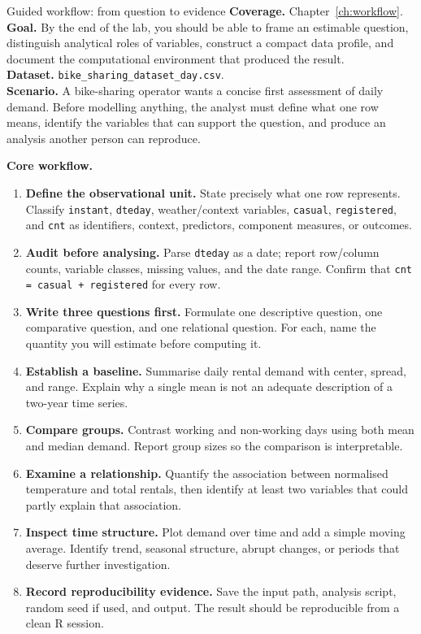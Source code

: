 
\begin{labproject}{Guided workflow: from question to evidence}
\textbf{Coverage.} Chapter~\ref{ch:workflow}.\\
\textbf{Goal.} By the end of the lab, you should be able to frame an estimable question, distinguish analytical roles of variables, construct a compact data profile, and document the computational environment that produced the result.\\
\textbf{Dataset.} \texttt{bike\_sharing\_dataset\_day.csv}.\\
\textbf{Scenario.} A bike-sharing operator wants a concise first assessment of daily demand. Before modelling anything, the analyst must define what one row means, identify the variables that can support the question, and produce an analysis another person can reproduce.

\textbf{Core workflow.}
\begin{enumerate}
  \item \textbf{Define the observational unit.} State precisely what one row represents. Classify \texttt{instant}, \texttt{dteday}, weather/context variables, \texttt{casual}, \texttt{registered}, and \texttt{cnt} as identifiers, context, predictors, component measures, or outcomes.
  \item \textbf{Audit before analysing.} Parse \texttt{dteday} as a date; report row/column counts, variable classes, missing values, and the date range. Confirm that \texttt{cnt = casual + registered} for every row.
  \item \textbf{Write three questions first.} Formulate one descriptive question, one comparative question, and one relational question. For each, name the quantity you will estimate before computing it.
  \item \textbf{Establish a baseline.} Summarise daily rental demand with center, spread, and range. Explain why a single mean is not an adequate description of a two-year time series.
  \item \textbf{Compare groups.} Contrast working and non-working days using both mean and median demand. Report group sizes so the comparison is interpretable.
  \item \textbf{Examine a relationship.} Quantify the association between normalised temperature and total rentals, then identify at least two variables that could partly explain that association.
  \item \textbf{Inspect time structure.} Plot demand over time and add a simple moving average. Identify trend, seasonal structure, abrupt changes, or periods that deserve further investigation.
  \item \textbf{Record reproducibility evidence.} Save the input path, analysis script, random seed if used, and  output. The result should be reproducible from a clean R session.
\end{enumerate}


\end{labproject}
